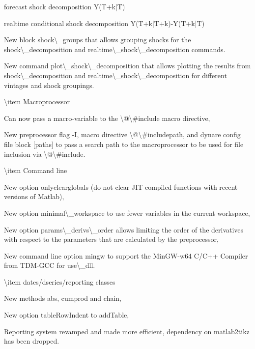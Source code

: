 \documentclass[10pt,math=newtx,citestyle=gb7714-2015,bibstyle=gb7714-2015]{elegantbook}
\begin{document}
	
	forecast shock decomposition Y(T+k|T)
	
	
	realtime conditional shock decomposition Y(T+k|T+k)-Y(T+k|T)
	
	
	
	
	New block shock\textbackslash{}\_groups that allows grouping shocks for the shock\textbackslash{}\_decomposition and realtime\textbackslash{}\_shock\textbackslash{}\_decomposition commands.
	
	
	New command plot\textbackslash{}\_shock\textbackslash{}\_decomposition that allows plotting the results from shock\textbackslash{}\_decomposition and realtime\textbackslash{}\_shock\textbackslash{}\_decomposition for different vintages and shock groupings.
	
	
	
	
	\textbackslash{}item Macroprocessor
	
	
	Can now pass a macro-variable to the \textbackslash{}@\textbackslash{}\#include macro directive,
	
	
	New preprocessor flag -I, macro directive \textbackslash{}@\textbackslash{}\#includepath, and dynare config file block [paths] to pass a search path to the macroprocessor to be used for file inclusion via \textbackslash{}@\textbackslash{}\#include.
	
	
	
	
	\textbackslash{}item Command line
	
	
	New option onlyclearglobals (do not clear JIT compiled functions with recent versions of Matlab),
	
	
	New option minimal\textbackslash{}\_workspace to use fewer variables in the current workspace,
	
	
	New option params\textbackslash{}\_derivs\textbackslash{}\_order allows limiting the order of the derivatives with respect to the parameters that are calculated by the preprocessor,
	
	
	New command line option mingw to support the MinGW-w64 C/C++ Compiler from TDM-GCC for use\textbackslash{}\_dll.
	
	
	
	
	\textbackslash{}item dates/dseries/reporting classes
	
	
	New methods abs, cumprod and chain,
	
	
	New option tableRowIndent to addTable,
	
	
	Reporting system revamped and made more efficient, dependency on matlab2tikz has been dropped.
	
	
	
\end{document}
